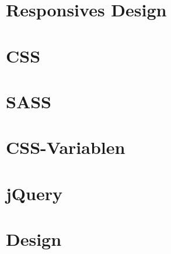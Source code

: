 \documentclass[
    headings=optiontotocandhead,%
    oneside,
    numbers=noenddot,%
    toc=flat, %
    12pt, %
    titlepage, %
    parskip=full, %
    listof=totoc, %
    listof=flat, %
    numbers=noenddot, %
    bibliography=totoc, %
    a4paper,DIV=14,
    BCOR=15mm,
]{scrbook}
\begin{document}
    

\section{Responsives Design}\label{Responsives Design}

\renewcommand{\kapitelautor}{Autor: Dominik Nußbaumer}

    

\section{CSS}\label{CSS}

\renewcommand{\kapitelautor}{Autor: Dominik Nußbaumer}

    

    

    

    

\section{SASS}\label{SASS}

\renewcommand{\kapitelautor}{Autor: Dominik Nußbaumer}

    

\section{CSS-Variablen}\label{CSS-Variablen}

\renewcommand{\kapitelautor}{Autor: Dominik Nußbaumer}

    

\section{jQuery}\label{jQuery}

\renewcommand{\kapitelautor}{Autor: Dominik Nußbaumer}

    

\section{Design}\label{Design}
\end{document}
